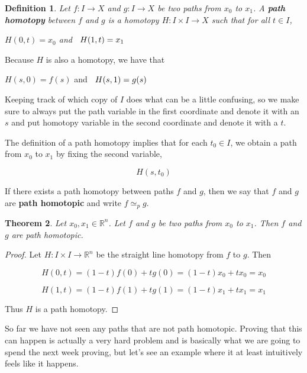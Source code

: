\documentclass[a4paper]{article}
\newtheorem{theorem}{Theorem}
\newtheorem{definition}[theorem]{Definition}
\numberwithin{theorem}{section}
\begin{document}
\begin{definition}
Let $f: I \rightarrow X$ and $g: I \rightarrow X$ be two paths from $x_0$ to $x_1$. A \textbf{path homotopy} between $f$ and $g$ is a homotopy $H: I \times I \rightarrow X$ such that for all $t \in I$,

\begin{center}
$ H(0,t) =  x_0 $ \hspace{0.2cm} and $\hspace{0.2cm} H(1,t) = x_1 $
\end{center}

\end{definition}

Because $H$ is also a homotopy, we have that

\begin{center}
$ H(s,0) =  f(s) $ \hspace{0.2cm} and $\hspace{0.2cm} H(s,1) = g(s) $
\end{center}

Keeping track of which copy of $I$ does what can be a little confusing, so we make sure to always put the path variable in the first coordinate and denote it with an $s$ and put homotopy variable in the second coordinate and denote it with a $t$.

The definition of a path homotopy implies that for each $t_0 \in I$, we obtain a path from $x_0$ to $x_1$ by fixing the second variable,

$$ H(s,t_0) $$

If there exists a path homotopy between paths $f$ and $g$, then we say that $f$ and $g$ are \textbf{path homotopic} and write $f \simeq_p g$.

\begin{theorem}
Let $x_0,x_1 \in \mathbb{R}^n$. Let $f$ and $g$ be two paths from $x_0$ to $x_1$. Then $f$ and $g$ are path homotopic.
\end{theorem}

\begin{proof}
Let $H: I \times I \rightarrow \mathbb{R}^n$ be the straight line homotopy from $f$ to $g$. Then

$$ H(0,t) = (1-t)f(0) + tg(0) = (1-t)x_0 + t x_0 = x_0$$

$$ H(1,t) = (1-t)f(1) + tg(1) = (1-t)x_1 + t x_1 = x_1$$

Thus $H$ is a path homotopy.
\end{proof}

So far we have not seen any paths that are not path homotopic. Proving that this can happen is actually a very hard problem and is basically what we are going to spend the next week proving, but let's see an example where it at least intuitively feels like it happens.
\end{document}
